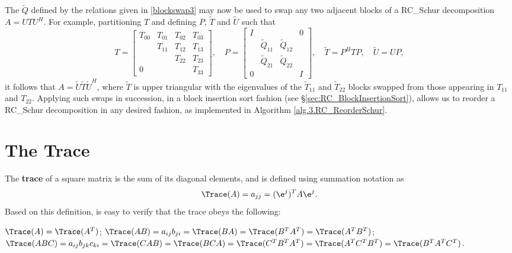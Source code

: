 The $\tilde Q$ defined by the relations given in \eqref{blockswap3} may now be used to swap any two adjacent blocks of a RC_Schur decomposition $A=U T U^H$.
For example, partitioning $T$ and defining $P$, $\tilde T$ and $\tilde U$ such that
\begin{equation*}
T=\begin{bmatrix} T_{00} & T_{01} & T_{02} & T_{03} \\  & T_{11} & T_{12} & T_{13} \\ &  & T_{22} & T_{23} \\ 0 &  &  & T_{33} \end{bmatrix}, \quad
P=\begin{bmatrix} I & &  & 0 \\ & \tilde Q_{11} & \tilde Q_{12} & \\ & \tilde Q_{21} & \tilde Q_{22} & \\ 0 & & & I \end{bmatrix}, \quad
\tilde T=P^H T P, \quad \tilde U=U P,
\end{equation*}
it follows that $A=\tilde U \tilde T \tilde U^H$, where $\tilde T$ is upper triangular with the eigenvalues of the $\tilde T_{11}$ and $\tilde T_{22}$ blocks swapped from those
appearing in $T_{11}$ and $T_{22}$.
Applying such swaps in succession, in a block insertion sort fashion (see \S \ref{sec:RC_BlockInsertionSort}),
allows us to reorder a RC_Schur decomposition in any desired fashion, as implemented in Algorithm \ref{alg.3.RC_ReorderSchur}. 

\section{The Trace}\label{sec.A.F.A}

The {\bf trace} of a square matrix is the sum of its diagonal elements, and is defined using summation notation as
\begin{equation*}
    \Trace(A)= a_{jj} = (\e^j)^T A \e^j.
\end{equation*}
Based on this definition,  is easy to verify that the trace obeys the following:

\begin{fact} \label{fact.A.F.A.a}
$\Trace(A)=\Trace(A^T)$;\quad
$\Trace(AB)= a_{ij} b_{ji} = \Trace(BA) = \Trace(B^T A^T) = \Trace(A^T B^T)$;\hfill\break
$\Trace(ABC)= a_{ij} b_{jk} c_{ki} =\Trace(CAB)=\Trace(BCA)=\Trace(C^T B^T A^T)=\Trace( A^T C^T B^T)=\Trace(B^T A^T C^T)$.
\end{fact}

